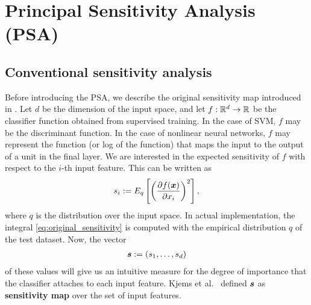 \section{Principal Sensitivity Analysis (PSA)}
\label{sec:methods}
%
\subsection{Conventional sensitivity analysis}
%
Before introducing the PSA, we describe the original sensitivity map
introduced in \cite{Kjems2002}.
%
Let $d$ be the dimension of the input space, and let
$f: \mathbb{R}^d \to \mathbb{R}$ be the classifier function obtained from supervised training.
%
In the case of SVM, $f$ may be the discriminant function.
%
In the case of nonlinear neural networks, $f$ may represent the function (or log of
the function) that maps the input to the output of a unit in the final layer.
%
We are interested in the expected sensitivity of $f$
with respect to the $i$-th input feature.
%
This can be written as
\begin{align}
\begin{split}
 \label{eq:original_sensitivity}
 s_i := E_q \left[ \left(\frac{\partial f(\mbox{\boldmath $x$})}{\partial x_i} \right)^2 \right],
\end{split}
\end{align}
%
where $q$ is the distribution over the input space.
%
In actual implementation, the integral \eqref{eq:original_sensitivity} is
computed with the empirical distribution $q$ of the test dataset.
%
Now, the vector
\begin{align}
\begin{split}
\mbox{\boldmath $s$} := \left(s_1, \dots, s_d \right)
\end{split} \label{eq:classical_def}
\end{align}
of these values will give us an intuitive measure for the degree
of importance that the classifier attaches to each input feature.
Kjems et al.\ \cite{Kjems2002} defined $\mbox{\boldmath $s$}$ as \textbf{sensitivity map} over the set
of input features.

